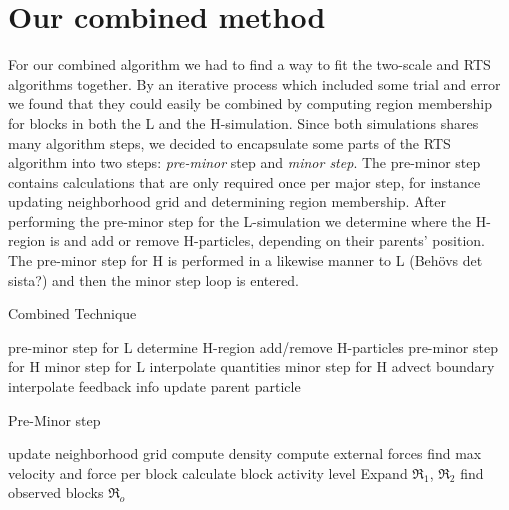 \documentclass[../../main.tex]{subfiles}
\begin{document}
\tracingall



\section{Our combined method}


For our combined algorithm we had to find a way to fit the two-scale and RTS algorithms together. By an iterative process which included some trial and error we found that they could easily be combined by computing region membership for blocks in both the L and the H-simulation. Since both simulations shares many algorithm steps, we decided to encapsulate some parts of the RTS algorithm into two steps: \textit{pre-minor} step and \textit{minor step}. The pre-minor step contains calculations that are only required once per major step, for instance updating neighborhood grid and determining region membership. After performing the pre-minor step for the L-simulation we determine where the H-region is and add or remove H-particles, depending on their parents' position. The pre-minor step for H is performed in a likewise manner to L (Behövs det sista?) and then the minor step loop is entered. 

\begin{algorithm}[h]
    \caption{Combined Technique}
    \label{alg:combined:main}
    \begin{algorithmic}[1]
            \State pre-minor step for L
            \State determine H-region
            \State add/remove H-particles
            \State pre-minor step for H
                \State minor step for L
                \State interpolate quantities
                  \State minor step for H
                  \State advect boundary
                \EndFor
            \State interpolate feedback info
            \EndFor
            \State update parent particle
        \EndWhile
   \end{algorithmic}
\end{algorithm}


\begin{algorithm}[h]
    \caption{Pre-Minor step}
    \label{alg:combined:preminorstep}
    \begin{algorithmic}[1]
    \State update neighborhood grid
    \State compute density
    \State compute external forces
    \State find max velocity and force per block
    \State calculate block activity level
    \State Expand $\Re$$_1$, $\Re$$_2$
    \State find observed blocks $\Re$$_o$
   \end{algorithmic}
\end{algorithm}
\end{document}

